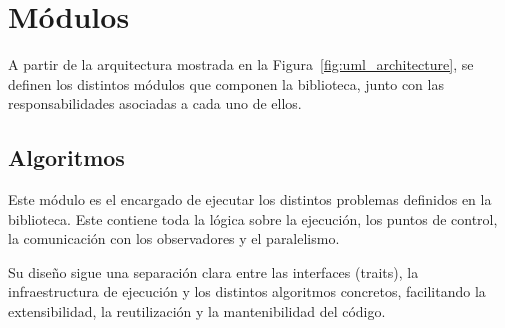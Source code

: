 \documentclass[12pt,a4paper,twoside,openright]{book}
\begin{document}
\section{Módulos}
    A partir de la arquitectura mostrada en la Figura~\ref{fig:uml_architecture}, se definen los distintos módulos que componen la biblioteca, junto con las responsabilidades asociadas a cada uno de ellos.
    
    \subsection{Algoritmos}

        Este módulo es el encargado de ejecutar los distintos problemas definidos en la biblioteca. Este contiene toda la lógica sobre la ejecución, los puntos de control, la comunicación con los observadores y el paralelismo.

        Su diseño sigue una separación clara entre las interfaces (traits), la infraestructura de ejecución y los distintos algoritmos concretos, facilitando la extensibilidad, la reutilización y la mantenibilidad del código.
\end{document}
